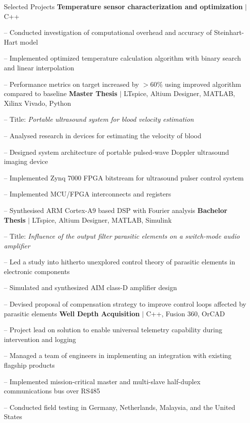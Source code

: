 \begin{rubric}{\faTasks[solid]  Selected Projects}
\entry*[2024][] \textbf{Temperature sensor characterization and optimization} $|$ C++ \par
	-- Conducted investigation of computational overhead and accuracy of Steinhart-Hart model \par
	-- Implemented optimized temperature calculation algorithm with binary search and linear interpolation \par
	-- Performance metrics on target increased by $>60\%$ using improved algorithm compared to baseline
\entry*[2023][]%
	\textbf{Master Thesis} $|$ LTspice, Altium Designer, MATLAB, Xilinx Vivado, Python \par
	-- Title: \emph{Portable ultrasound system for blood velocity estimation} \par
	-- Analysed research in devices for estimating the velocity of blood \par
	-- Designed system architecture of portable pulsed-wave Doppler ultrasound imaging device \par
	-- Implemented Zynq 7000 FPGA bitstream for ultrasound pulser control system \par
	-- Implemented MCU/FPGA interconnects and registers \par
	-- Synthesised ARM Cortex\textsuperscript{\textcopyright}-A9 based DSP with Fourier analysis
%
\entry*[2020][] \textbf{Bachelor Thesis} $|$ LTspice, Altium Designer, MATLAB, Simulink \par
	-- Title: \emph{Influence of the output filter parasitic elements on a switch-mode audio amplifier} \par
	-- Led a study into hitherto unexplored control theory of parasitic elements in electronic components \par
	-- Simulated and synthesized AIM class-D amplifier design\par
	-- Devised proposal of compensation strategy to improve control loops affected by parasitic elements
%
\entry*[2017][] \textbf{Well Depth Acquisition} $|$ C++, Fusion 360, OrCAD \par
	-- Project lead on solution to enable universal telemetry capability during intervention and logging \par
	-- Managed a team of engineers in implementing an integration with existing flagship products \par
	-- Implemented mission-critical master and multi-slave half-duplex communications bus over RS485 \par
	-- Conducted field testing in Germany, Netherlands, Malaysia, and the United States
%
\end{rubric}